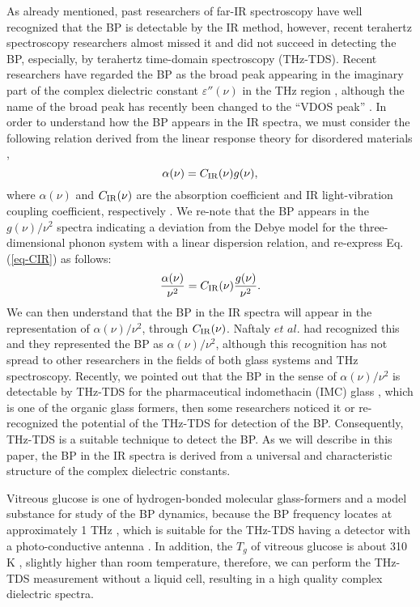 \documentclass[%
 reprint,
superscriptaddress,
 amsmath,amssymb,
 aps,
prb,
]{revtex4-1}
\begin{document}
As already mentioned, past researchers of far-IR spectroscopy have well recognized that the BP is detectable by the IR method\cite{Matsuishi1986, Hutt1989, Ohsaka1994, Ohsaka1998}, however, recent terahertz spectroscopy researchers almost missed it and did not succeed in detecting the BP, especially, by terahertz time-domain spectroscopy (THz-TDS). Recent researchers have regarded the BP as the broad peak appearing in the imaginary part of the complex dielectric constant $\varepsilon''(\nu)$ in the THz region \cite{Loidl2012, Kojima2003, Mori2015}, although the name of the broad peak has recently been changed to the ``VDOS peak'' \cite{Parrott2015}. In order to understand how the BP appears in the IR spectra, we must consider the following relation derived from the linear response theory for disordered materials \cite{Galeener1978},
\begin{equation}
\alpha(\nu) = C_{\rm IR}(\nu)g(\nu),
\label{eq-CIR}
\end{equation}
where $\alpha(\nu)$ and $C_{\rm IR}(\nu)$ are the absorption coefficient and IR light-vibration coupling coefficient, respectively \cite{footnote1}.
We re-note that the BP appears in the $g(\nu)/\nu^{2}$ spectra indicating a deviation from the Debye model for the three-dimensional phonon system with a linear dispersion relation, and re-express Eq. (\ref{eq-CIR}) as follows:
\begin{equation}
\frac{\alpha(\nu)}{\nu^{2}} = C_{\rm IR}(\nu)\frac{g(\nu)}{\nu^{2}}.
\label{eq-af2}
\end{equation}
We can then understand that the BP in the IR spectra will appear in the representation of $\alpha(\nu)/\nu^{2}$, through $C_{\rm IR}(\nu)$.
Naftaly $et$ $al$. \cite{Naftaly2005} had recognized this and they represented the BP as $\alpha(\nu)/\nu^{2}$, although this recognition has not spread to other researchers in the fields of both glass systems and THz spectroscopy.
Recently, we pointed out that the BP in the sense of $\alpha(\nu)/\nu^{2}$ is detectable by THz-TDS for the pharmaceutical indomethacin (IMC) glass \cite{Shibata2015, Kojima2015}, which is one of the organic glass formers, then some researchers noticed it \cite{Sibik2016} or re-recognized the potential of the THz-TDS for detection of the BP.
Consequently, THz-TDS is a suitable technique to detect the BP. As we will describe in this paper, the BP in the IR spectra is derived from a universal and characteristic structure of the complex dielectric constants.

Vitreous glucose is one of hydrogen-bonded molecular glass-formers and a model substance for study of the BP dynamics, because the BP frequency locates at approximately 1 THz \cite{Violini2012}, which is  suitable for the THz-TDS having a detector with a photo-conductive antenna \cite{Shibata2015, Helal2015}.
In addition, the $T_{g}$ of vitreous glucose is about 310 K \cite{Wungtanagorn2001}, slightly higher than room temperature, therefore, we can perform the THz-TDS measurement without a liquid cell, resulting in a high quality complex dielectric spectra.
\end{document}
